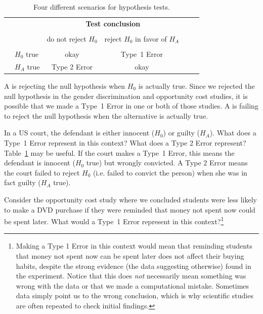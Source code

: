 \begin{table}[ht]
\centering
\begin{tabular}{l l c c c}
& & \multicolumn{2}{c}{\textbf{Test conclusion}} \\
  \cline{3-4}
\vspace{-3.7mm} \\
& & do not reject $H_0$ &  reject $H_0$ in favor of $H_A$ &
\ \hspace{7mm} \  \\
  \cline{2-4}
\vspace{-3.7mm} \\
& $H_0$ true & okay &  Type~1 Error \\
\raisebox{1.5ex}{\textbf{Truth}} & $H_A$ true & Type 2 Error & okay \\
  \cline{2-4}
\end{tabular}
\caption{Four different scenarios for hypothesis tests.}
\label{fourHTScenarios}
\end{table}

A  is rejecting the null hypothesis when $H_0$ is actually true. Since we rejected the null hypothesis in the gender discrimination and opportunity cost studies, it is possible that we made a Type~1 Error in one or both of those studies. A  is failing to reject the null hypothesis when the alternative is actually true.

\begin{example}{In a US court, the defendant is either innocent ($H_0$) or  guilty ($H_A$). What does a Type~1 Error represent in this context? What does a Type 2 Error represent? Table~\ref{fourHTScenarios} may be useful.}
If the court makes a Type~1 Error, this means the defendant is innocent ($H_0$ true) but wrongly convicted. A Type 2 Error means the court failed to reject $H_0$ (i.e. failed to convict the person) when she was in fact guilty ($H_A$ true).
\end{example}

\begin{exercise}
Consider the opportunity cost study where we concluded students were less likely to make a DVD purchase if they were reminded that money not spent now could be spent later. What would a Type~1 Error represent in this context?\footnote{Making a Type 1 Error in this context would mean that reminding students that money not spent now can be spent later does not affect their buying habits, despite the strong evidence (the data suggesting otherwise) found in the experiment. Notice that this does \emph{not} necessarily mean something was wrong with the data or that we made a computational mistake. Sometimes data simply point us to the wrong conclusion, which is why scientific studies are often repeated to check initial findings.}
\end{exercise}

